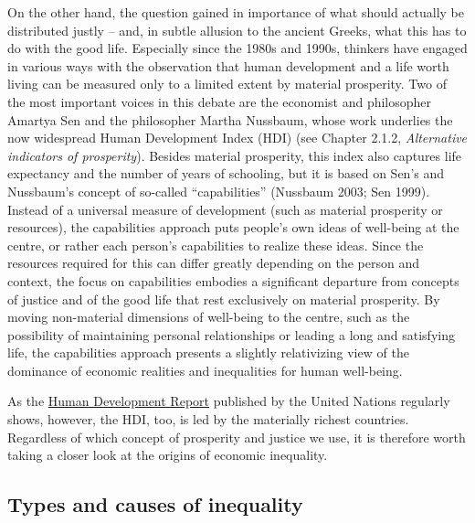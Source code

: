\documentclass[
  british,
  a4paper,
  DIV=11,
  numbers=noendperiod,
  oneside,
  openany]{scrreprt}
\begin{document}
On the other hand, the question gained in importance of what should
actually be distributed justly -- and, in subtle allusion to the ancient
Greeks, what this has to do with the good life. Especially since the
1980s and 1990s, thinkers have engaged in various ways with the
observation that human development and a life worth living can be
measured only to a limited extent by material prosperity. Two of the
most important voices in this debate are the economist and philosopher
Amartya Sen and the philosopher Martha Nussbaum, whose work underlies
the now widespread Human Development Index (HDI) (see Chapter 2.1.2,
\emph{Alternative indicators of prosperity}). Besides material
prosperity, this index also captures life expectancy and the number of
years of schooling, but it is based on Sen's and Nussbaum's concept of
so-called ``capabilities'' (Nussbaum 2003; Sen 1999). Instead of a
universal measure of development (such as material prosperity or
resources), the capabilities approach puts people's own ideas of
well-being at the centre, or rather each person's capabilities to
realize these ideas. Since the resources required for this can differ
greatly depending on the person and context, the focus on capabilities
embodies a significant departure from concepts of justice and of the
good life that rest exclusively on material prosperity. By moving
non-material dimensions of well-being to the centre, such as the
possibility of maintaining personal relationships or leading a long and
satisfying life, the capabilities approach presents a slightly
relativizing view of the dominance of economic realities and
inequalities for human well-being.

As the
\href{https://hdr.undp.org/content/human-development-report-2025}{Human
Development Report} published by the United Nations regularly shows,
however, the HDI, too, is led by the materially richest countries.
Regardless of which concept of prosperity and justice we use, it is
therefore worth taking a closer look at the origins of economic
inequality.

\subsection{Types and causes of
inequality}\label{types-and-causes-of-inequality}
\end{document}
